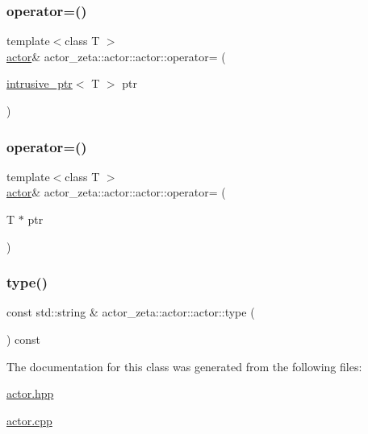 \subsubsection{\texorpdfstring{operator=()}{operator=()}\hspace{0.1cm}{\footnotesize\ttfamily [3/4]}}
{\footnotesize\ttfamily template$<$class T $>$ \\
\hyperlink{classactor__zeta_1_1actor_1_1actor}{actor}\& actor\+\_\+zeta\+::actor\+::actor\+::operator= (\begin{DoxyParamCaption}\item[{\hyperlink{classactor__zeta_1_1intrusive__ptr}{intrusive\+\_\+ptr}$<$ T $>$}]{ptr }\end{DoxyParamCaption})\hspace{0.3cm}{\ttfamily [inline]}}

\mbox{\label{classactor__zeta_1_1actor_1_1actor_a9573ab3ea73f292601ee7094ac63c37e}} 
\subsubsection{\texorpdfstring{operator=()}{operator=()}\hspace{0.1cm}{\footnotesize\ttfamily [4/4]}}
{\footnotesize\ttfamily template$<$class T $>$ \\
\hyperlink{classactor__zeta_1_1actor_1_1actor}{actor}\& actor\+\_\+zeta\+::actor\+::actor\+::operator= (\begin{DoxyParamCaption}\item[{T $\ast$}]{ptr }\end{DoxyParamCaption})\hspace{0.3cm}{\ttfamily [inline]}}

\mbox{\label{classactor__zeta_1_1actor_1_1actor_a6ea7c424ac30d951cd1a003d39e82755}} 
\subsubsection{\texorpdfstring{type()}{type()}}
{\footnotesize\ttfamily const std\+::string \& actor\+\_\+zeta\+::actor\+::actor\+::type (\begin{DoxyParamCaption}{ }\end{DoxyParamCaption}) const}



The documentation for this class was generated from the following files\+:\begin{DoxyCompactItemize}
\item 
\hyperlink{actor_8hpp}{actor.\+hpp}\item 
\hyperlink{actor_8cpp}{actor.\+cpp}\end{DoxyCompactItemize}
